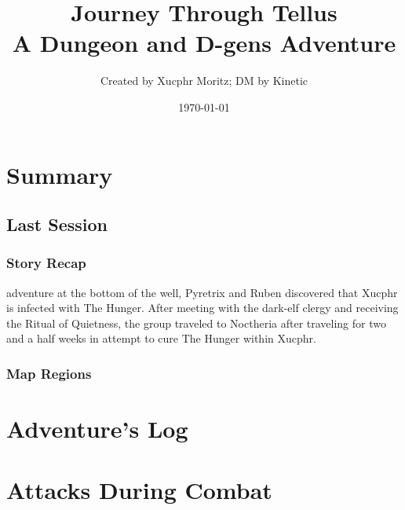 \documentclass[letterpaper,twocolumn,openany,nodeprecatedcode]{dndbook}
\title{Journey Through Tellus \\
\large A Dungeon and D-gens Adventure}
\author{Created by Xucphr Moritz; DM by Kinetic}
\date{\today}
\begin{document}
\frontmatter

\maketitle

\tableofcontents

\mainmatter%

\part{Summary}


\chapter*{Last Session}
\section{Story Recap}
 adventure at the bottom of the well, Pyretrix and Ruben discovered that Xucphr is infected with The Hunger. After meeting with the dark-elf clergy and receiving the Ritual of Quietness, the group traveled to Noctheria after traveling for two and a half weeks in attempt to cure The Hunger within Xucphr.

\section{Map Regions}



\part{Adventure's Log}


\part{Attacks During Combat}



%


%
\end{document}
